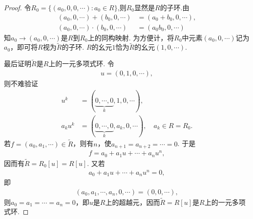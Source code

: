 \documentclass[../../main.tex]{subfiles}%
\begin{document}
\begin{proof}
令$R_0=\{(a_0,0,0,\cdots):a_0\in R\}$,则$R_0$显然是$R$的子环.由
\begin{align*}
(a_0,0,\cdots)+(b_0,0,\cdots)&=(a_0+b_0,0,\cdots),\\
(a_0,0,\cdots)\cdot(b_0,0,\cdots)&=(a_0b_0,0,\cdots)
\end{align*}
知$a_0\to(a_0,0,\cdots)$是$R$到$R_0$上的同构映射. 为方便计，将$R_0$中元素$(a_0,0,\cdots)$记为$a_0$，即可将$R$视为$\widetilde{R}$的子环. $R$的幺元$1$恰为$\widetilde{R}$的幺元$(1,0,\cdots)$.

最后证明$\widetilde{R}$是$R$上的一元多项式环. 令
\begin{align*}
u=(0,1,0,\cdots),
\end{align*}
则不难验证
\begin{align*}
u^k&=(\underbrace{0,\cdots,0}_{k},1,0,\cdots),\\
a_ku^k&=(\underbrace{0,\cdots,0}_{k},a_k,0,\cdots),\quad a_k\in R=R_0.
\end{align*}
若$f=(a_0,a_1,\cdots)\in\widetilde{R}$，则有$n$，使$a_{n+1}=a_{n+2}=\cdots=0$. 于是
\begin{align*}
f=a_0+a_1u+\cdots+a_nu^n,
\end{align*}
因而有$\widetilde{R}=R_0[u]=R[u]$. 又若
\begin{align*}
a_0+a_1u+\cdots+a_nu^n=0,
\end{align*}
即
\begin{align*}
(a_0,a_1,\cdots,a_n,0,\cdots)=(0,0,\cdots),
\end{align*}
则$a_0=a_1=\cdots=a_n=0$，即$u$是$R$上的超越元，因而$\widetilde{R}=R[u]$是$R$上的一元多项式环.
\end{proof}
\end{document}
